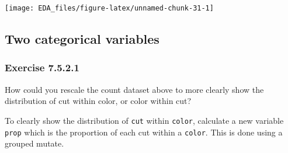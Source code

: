 \documentclass[]{book}
\newenvironment{Shaded}{\begin{snugshade}}{\end{snugshade}}
\newcommand{\CommentTok}[1]{\textcolor[rgb]{0.56,0.35,0.01}{\textit{#1}}}
\newcommand{\DataTypeTok}[1]{\textcolor[rgb]{0.13,0.29,0.53}{#1}}
\newcommand{\DecValTok}[1]{\textcolor[rgb]{0.00,0.00,0.81}{#1}}
\newcommand{\KeywordTok}[1]{\textcolor[rgb]{0.13,0.29,0.53}{\textbf{#1}}}
\newcommand{\NormalTok}[1]{#1}
\newcommand{\OperatorTok}[1]{\textcolor[rgb]{0.81,0.36,0.00}{\textbf{#1}}}
\newcommand{\StringTok}[1]{\textcolor[rgb]{0.31,0.60,0.02}{#1}}
\theoremstyle{plain}
\theoremstyle{remark}
\begin{document}
\begin{center}\texttt{[image: EDA\_files/figure-latex/unnamed-chunk-31-1]} \end{center}

\hypertarget{two-categorical-variables}{%
\subsection{Two categorical variables}\label{two-categorical-variables}}

\hypertarget{exercise-7.5.2.1}{%
\subsubsection*{\texorpdfstring{Exercise
{7.5.2.1}}{Exercise 7.5.2.1}}\label{exercise-7.5.2.1}}

How could you rescale the count dataset above to more clearly show the
distribution of cut within color, or color within cut?

To clearly show the distribution of \texttt{cut} within \texttt{color},
calculate a new variable \texttt{prop} which is the proportion of each
cut within a \texttt{color}. This is done using a grouped mutate.

\begin{Shaded}
\end{Shaded}
\end{document}

